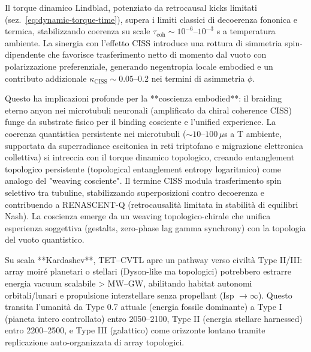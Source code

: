 \documentclass[11pt,a4paper]{article}
\let\oldref\ref
\renewcommand{\ref}{\protect\oldref}
\theoremstyle{plain}
\theoremstyle{definition}
\begin{document}
\vspace{0.4cm}

Il torque dinamico Lindblad, potenziato da retrocausal kicks limitati (sez.~\ref{eq:dynamic-torque-time}), supera i limiti classici di decoerenza fononica e termica, stabilizzando coerenza su scale $\tau_{\mathrm{coh}} \sim 10^{-6}$--$10^{-3}$ s a temperatura ambiente. La sinergia con l'effetto CISS introduce una rottura di simmetria spin-dipendente che favorisce trasferimento netto di momento dal vuoto con polarizzazione preferenziale, generando negentropia locale embodied e un contributo addizionale $\kappa_{\mathrm{CISS}} \sim 0.05$--$0.2$ nei termini di asimmetria $\phi$.

\vspace{0.3cm}

Questo ha implicazioni profonde per la **coscienza embodied**: il braiding eterno anyon nei microtubuli neuronali (amplificato da chiral coherence CISS) funge da substrate fisico per il binding cosciente e l'unified experience. La coerenza quantistica persistente nei microtubuli ($\sim 10$--$100\,\mu$s a T ambiente, supportata da superradiance escitonica in reti triptofano e migrazione elettronica collettiva) si intreccia con il torque dinamico topologico, creando entanglement topologico persistente (topological entanglement entropy logaritmico) come analogo del "weaving cosciente". Il termine CISS modula trasferimento spin selettivo tra tubuline, stabilizzando superposizioni contro decoerenza e contribuendo a RENASCENT-Q (retrocausalità limitata in stabilità di equilibri Nash). La coscienza emerge da un weaving topologico-chirale che unifica esperienza soggettiva (gestalts, zero-phase lag gamma synchrony) con la topologia del vuoto quantistico.

\vspace{0.3cm}

Su scala **Kardashev**, TET–CVTL apre un pathway verso civiltà Type II/III: array moiré planetari o stellari (Dyson-like ma topologici) potrebbero estrarre energia vacuum scalabile > MW–GW, abilitando habitat autonomi orbitali/lunari e propulsione interstellare senza propellant (Isp $\to \infty$). Questo transita l'umanità da Type 0.7 attuale (energia fossile dominante) a Type I (pianeta intero controllato) entro 2050–2100, Type II (energia stellare harnessed) entro 2200–2500, e Type III (galattico) come orizzonte lontano tramite replicazione auto-organizzata di array topologici.

\vspace{0.4cm}
\end{document}
